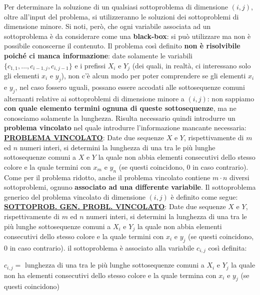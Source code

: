 \documentclass[12pt]{article}
\begin{document}
Per determinare la soluzione di un qualsiasi sottoproblema di dimensione $(i,j)$, oltre all'input del problema, si utilizzeranno le soluzioni dei sottoproblemi di dimensione minore.
Si noti, però, che ogni variabile associata ad un sottoproblema è da considerare come una \textbf{black-box}: si può utilizzare ma non è possibile conoscerne il contenuto.
Il problema così definito \textbf{non è risolvibile poiché ci manca informazione}: date solamente le variabili $\{c_{1,1}, \dots, c_{i-1,j}, c_{i, j-1}\}$ e i prefissi $X_i$ e $Y_j$ (dei quali, in realtà, ci interessano solo gli elementi $x_i$ e $y_j$), non c'è
alcun modo per poter comprendere se gli elementi $x_i$ e $y_j$, nel caso fossero uguali, possano essere accodati alle sottosequenze comuni alternanti relative ai sottoproblemi di dimensione minore a $(i,j)$: non sappiamo \textbf{con quale elemento termini ognuna di queste sottosequenze}, ma ne conosciamo solamente la lunghezza.
Risulta necessario quindi introdurre un \textbf{problema vincolato} nel quale introdurre l'informazione mancante necessaria: \newline
\textbf{\underline{PROBLEMA VINCOLATO}}: Date due sequenze $X$ e $Y$, rispettivamente di $m$ ed $n$ numeri interi, si determini la lunghezza di una tra le più lunghe sottosequenze comuni a $X$ e $Y$ la quale non abbia elementi consecutivi dello stesso colore
e la quale termini con $x_m$ e $y_n$ (se questi coincidono, $0$ in caso contrario). \newline
Come per il problema ridotto, anche il problema vincolato contiene $m \cdot n$ diversi sottoproblemi, ognuno \textbf{associato ad una differente variabile}. Il sottoproblema generico del problema vincolato di dimensione $(i,j)$ è definito come segue: \newline
\textbf{\underline{SOTTOPROB. GEN. PROBL. VINCOLATO}}: Date due sequenze $X$ e $Y$, rispettivamente di $m$ ed $n$ numeri interi, si determini la lunghezza di una tra le più lunghe sottosequenze comuni a $X_i$ e $Y_j$ la quale non abbia elementi consecutivi dello stesso colore
e la quale termini con $x_i$ e $y_j$ (se questi coincidono, $0$ in caso contrario). \newline
il sottoproblema è associato alla variabile $c_{i,j}$ così definita:
\begin{center}
    $c_{i,j} =$ lunghezza di una tra le più lunghe sottosequenze comuni a $X_i$ e $Y_j$ la quale non ha elementi consecutivi dello stesso colore e la quale termina con $x_i$ e $y_j$ (se questi coincidono)
\end{center}
\end{document}
